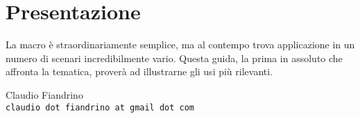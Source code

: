 {}
\chapter*{Presentazione}
La macro  è straordinariamente semplice, ma al contempo trova applicazione in un numero di scenari incredibilmente vario. Questa guida, la prima in assoluto che affronta la tematica, proverà ad illustrarne gli usi più rilevanti. 

\begin{flushright}
\begin{minipage}[t]{0.5\textwidth}
\centering
Claudio Fiandrino\\[1ex]
\scriptsize\texttt{claudio dot fiandrino at gmail dot com}
\end{minipage}
\end{flushright}
